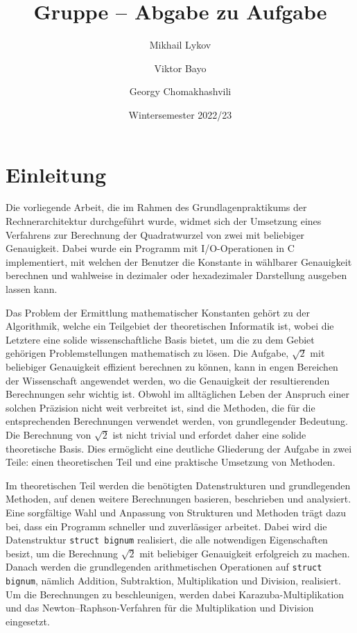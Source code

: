 \documentclass[course=erap]{aspdoc}
\author{Mikhail Lykov \and Viktor Bayo \and Georgy Chomakhashvili}
\date{Wintersemester 2022/23} %
\title{Gruppe \theGroup{} -- Abgabe zu Aufgabe \theNumber}
\begin{document}
\maketitle

\section{Einleitung}
 Die vorliegende Arbeit, die im Rahmen des Grundlagenpraktikums der Rechnerarchitektur durchgeführt wurde, widmet sich der Umsetzung eines Verfahrens zur Berechnung der Quadratwurzel von zwei mit beliebiger Genauigkeit. Dabei wurde ein Programm mit I/O-Operationen in C implementiert, mit welchen der Benutzer die Konstante in wählbarer Genauigkeit berechnen und wahlweise in dezimaler oder hexadezimaler Darstellung ausgeben lassen kann.
 
 Das Problem der Ermittlung mathematischer Konstanten gehört zu der Algorithmik, welche ein Teilgebiet der theoretischen Informatik ist, wobei die Letztere eine solide wissenschaftliche Basis bietet, um die zu dem Gebiet gehörigen Problemstellungen mathematisch zu lösen. Die Aufgabe, $\sqrt{2}$ mit beliebiger Genauigkeit effizient berechnen zu können, kann in engen Bereichen der Wissenschaft angewendet werden, wo die Genauigkeit der resultierenden Berechnungen sehr wichtig ist. Obwohl im alltäglichen Leben der Anspruch einer solchen Präzision nicht weit verbreitet ist, sind die Methoden, die für die entsprechenden Berechnungen verwendet werden, von grundlegender Bedeutung. Die Berechnung von $\sqrt{2}$ ist nicht trivial und erfordet daher eine solide theoretische Basis. Dies ermöglicht eine deutliche Gliederung der Aufgabe in zwei Teile: einen theoretischen Teil und eine praktische Umsetzung von Methoden.
 
 Im theoretischen Teil werden die benötigten Datenstrukturen und grundlegenden Methoden, auf denen weitere Berechnungen basieren, beschrieben und analysiert. Eine sorgfältige Wahl und Anpassung von Strukturen und Methoden trägt dazu bei, dass ein Programm schneller und zuverlässiger arbeitet. Dabei wird die Datenstruktur \texttt{struct bignum} realisiert, die alle notwendigen Eigenschaften besizt, um die Berechnung $\sqrt{2}$ mit beliebiger Genauigkeit erfolgreich zu machen. Danach werden die grundlegenden arithmetischen Operationen auf \texttt{struct bignum}, nämlich Addition, Subtraktion, Multiplikation und Division, realisiert. Um die Berechnungen zu beschleunigen, werden dabei Karazuba-Multiplikation und das Newton–Raphson-Verfahren für die Multiplikation und Division eingesetzt.
 
\end{document}

